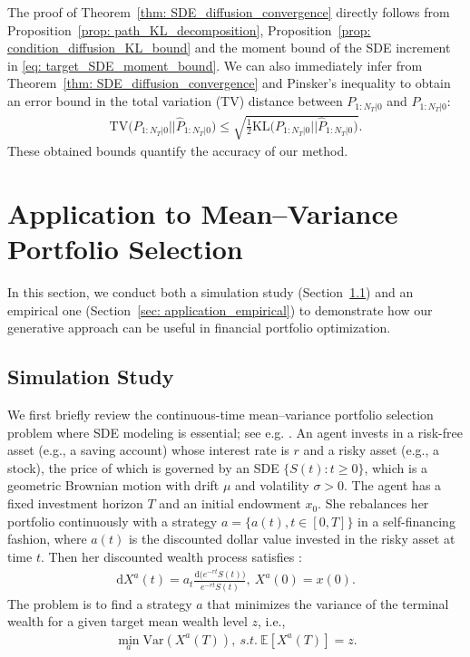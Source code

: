 \documentclass[11pt]{article}
\newcommand{\genP}{\hat P}
\newcommand{\KL}{\text{KL}}
\newcommand{\TV}{\text{TV}}
\newcommand{\intd}{\mathrm{d}}
\begin{document}
The proof of Theorem~\ref{thm: SDE_diffusion_convergence} directly follows from Proposition~\ref{prop: path_KL_decomposition}, Proposition~\ref{prop: condition_diffusion_KL_bound} and the moment bound of the SDE increment in \eqref{eq: target_SDE_moment_bound}. We can also immediately infer from Theorem~\ref{thm: SDE_diffusion_convergence} and Pinsker's inequality to obtain an error bound in
the total variation (TV) distance between $P_{1:N_T|0}$ and $\genP_{1:N_T|0}$:
    \begin{align*}
        \TV\big(P_{1:N_T|0} || \genP_{1:N_T|0}\big) \le \sqrt{\frac{1}{2} \KL\big(P_{1:N_T|0} || \genP_{1:N_T|0}\big)}.
    \end{align*}
    These obtained bounds quantify the accuracy of our method.




\section{Application to Mean--Variance Portfolio Selection}\label{sec:application}
In this section, we conduct both a simulation study (Section~\ref{sec: application_simulation}) and an empirical one (Section~\ref{sec: application_empirical}) to demonstrate how our generative approach can be useful in financial portfolio optimization.

\subsection{Simulation Study}\label{sec: application_simulation}
We first briefly review the continuous-time mean--variance portfolio selection problem where SDE modeling is essential; see e.g. \cite{wang2020continuous, zhou2000continuous}. An agent invests in a risk-free asset (e.g., a saving account) whose interest rate is  $r$ and a risky asset (e.g., a stock), the price of which is governed by an SDE $\{S(t): t\ge 0\}$, which is a geometric Brownian motion with drift $\mu$ and
volatility $\sigma>0$. The agent
has a fixed investment horizon $T$ and an initial endowment $x_0$.
She rebalances her portfolio continuously with a strategy $a = \{a(t), t\in[0, T]\}$ in a self-financing fashion, where $a(t)$ is the discounted dollar value invested in the risky asset at time $t$. Then her discounted wealth process satisfies \cite[Section 7.1]{jia2023q}:
\begin{align}\label{eq: MV_wealth_process}
    \intd X^a(t) = a_t\frac{\intd \big(e^{-rt}S(t)\big)}{e^{-rt}S(t)}, \ X^a(0) = x(0).
\end{align}
The problem is to find a strategy $a$ that minimizes the variance of the terminal wealth for a given target mean wealth level $z$, i.e.,
\begin{align}\label{eq: MV_objective}
    \min_a \text{Var}(X^a(T)),\ s.t.\ \mathbb{E}[X^a(T)] = z.
\end{align}
\end{document}
